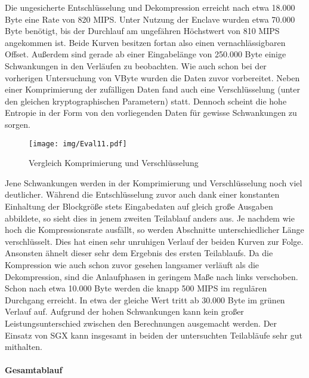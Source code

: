 Die ungesicherte Entschlüsselung und Dekompression erreicht nach etwa 18.000 Byte eine Rate von 820 MIPS. Unter Nutzung der Enclave wurden etwa 70.000 Byte benötigt, bis der Durchlauf am ungefähren Höchstwert von 810 MIPS angekommen ist. Beide Kurven besitzen fortan also einen vernachlässigbaren Offset. Außerdem sind gerade ab einer Eingabelänge von 250.000 Byte einige Schwankungen in den Verläufen zu beobachten. Wie auch schon bei der vorherigen Untersuchung von VByte wurden die Daten zuvor vorbereitet. Neben einer Komprimierung der zufälligen Daten fand auch eine Verschlüsselung (unter den gleichen kryptographischen Parametern) statt. Dennoch scheint die hohe Entropie in der Form von den vorliegenden Daten für gewisse Schwankungen zu sorgen.

\begin{figure}[h]
	\texttt{[image: img/Eval11.pdf]}
	\centering
	\caption{Vergleich Komprimierung und Verschlüsselung}
	\label{fig:eval11}
\end{figure}

Jene Schwankungen werden in der Komprimierung und Verschlüsselung noch viel deutlicher. Während die Entschlüsselung zuvor auch dank einer konstanten Einhaltung der Blockgröße stets Eingabedaten auf gleich große Ausgaben abbildete, so sieht dies in jenem zweiten Teilablauf anders aus. Je nachdem wie hoch die Kompressionsrate ausfällt, so werden Abschnitte unterschiedlicher Länge verschlüsselt. Dies hat einen sehr unruhigen Verlauf der beiden Kurven zur Folge. Ansonsten ähnelt dieser sehr dem Ergebnis des ersten Teilablaufs. Da die Kompression wie auch schon zuvor gesehen langsamer verläuft als die Dekompression, sind die Anlaufphasen in geringem Maße nach links verschoben. Schon nach etwa 10.000 Byte werden die knapp 500 MIPS im regulären Durchgang erreicht. In etwa der gleiche Wert tritt ab 30.000 Byte im grünen Verlauf auf. Aufgrund der hohen Schwankungen kann kein großer Leistungsunterschied zwischen den Berechnungen ausgemacht werden. Der Einsatz von SGX kann insgesamt in beiden der untersuchten Teilabläufe sehr gut mithalten.

\paragraph{Gesamtablauf}


